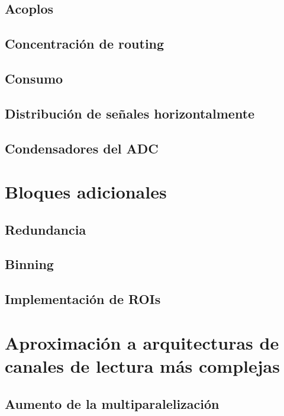 \documentclass[12pt,a4paper,oneside,titlepage]{report}
\begin{document}
\subsection{Acoplos}

\subsection{Concentración de routing}

\subsection{Consumo}

\subsection{Distribución de señales horizontalmente}

\subsection{Condensadores del ADC}

\section{Bloques adicionales}

\subsection{Redundancia}

\subsection{Binning}

\subsection{Implementación de ROIs}

\section{Aproximación a arquitecturas de canales de lectura más complejas}

\subsection{Aumento de la multiparalelización}
\end{document}
